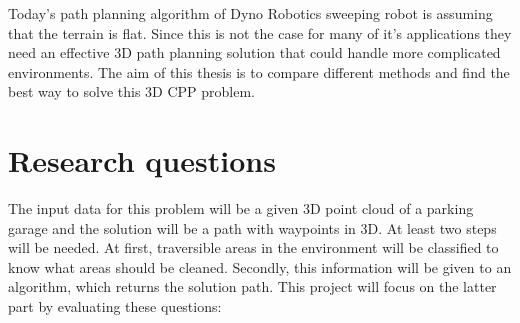 
Today's path planning algorithm of Dyno Robotics sweeping robot is assuming that the terrain is flat. Since this is not the case for many of it's applications they need an effective 3D path planning solution that could handle more complicated environments. The aim of this thesis is to compare different methods and find the best way to solve this 3D CPP problem. 



\section{Research questions}
\label{sec:research-questions}

The input data for this problem will be a given 3D point cloud of a parking garage and the solution will be a path with waypoints in 3D. At least two steps will be needed. At first, traversible areas in the environment will be classified to know what areas should be cleaned. Secondly, this information will be given to an algorithm, which returns the solution path. This project will focus on the latter part by evaluating these questions:





